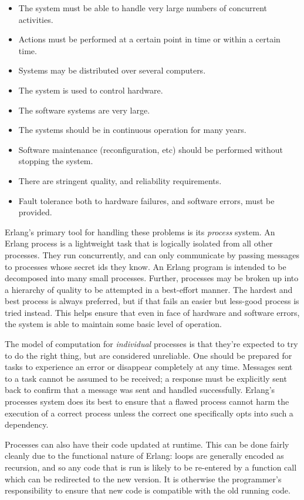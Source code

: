 \documentclass[10pt,a4paper,twocolumn]{article}
\begin{document}
\begin{itemize}
    \item The system must be able to handle very large numbers of concurrent activities.
    \item Actions must be performed at a certain point in time or within a certain time.
    \item Systems may be distributed over several computers.
    \item The system is used to control hardware.
    \item The software systems are very large.
    \item The systems should be in continuous operation for many years.
    \item Software maintenance (reconfiguration, etc) should be performed without stopping the system.
    \item There are stringent quality, and reliability requirements.
    \item Fault tolerance both to hardware failures, and software errors, must be provided.
\end{itemize}

Erlang's primary tool for handling these problems is its \emph{process} system.
\cite{erlangthesis} An Erlang process is a lightweight task that is logically
isolated from all other processes. They run concurrently, and can only
communicate by passing messages to processes whose secret ids they know. An
Erlang program is intended to be decomposed into many small processes. Further,
processes may be broken up into a hierarchy of quality to be attempted in a
best-effort manner. The hardest and best process is always preferred, but if
that fails an easier but less-good process is tried instead. This helps ensure
that even in face of hardware and software errors, the system is able to
maintain some basic level of operation.

The model of computation for \emph{individual} processes is that they're
expected to try to do the right thing, but are considered unreliable. One should
be prepared for tasks to experience an error or disappear completely at any
time. Messages sent to a task cannot be assumed to be received; a response must
be explicitly sent back to confirm that a message was sent and handled
successfully. Erlang's processes system does its best to ensure that a flawed
process cannot harm the execution of a correct process unless the correct one
specifically opts into such a dependency.

Processes can also have their code updated at runtime. This can be done fairly
cleanly due to the functional nature of Erlang: loops are generally encoded as
recursion, and so any code that is run is likely to be re-entered by a function
call which can be redirected to the new version. It is otherwise the
programmer's responsibility to ensure that new code is compatible with the old
running code. \cite{erlangthesis}
\end{document}
